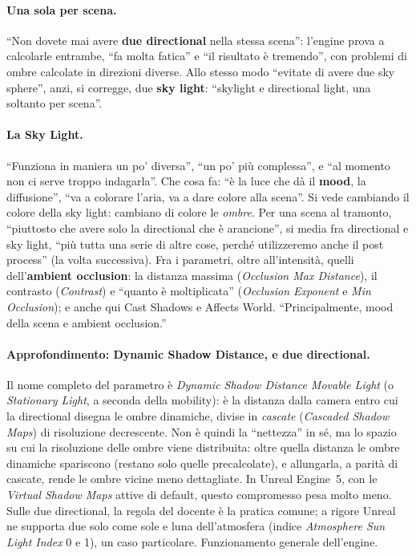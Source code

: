 \paragraph{Una sola per scena.} ``Non dovete mai avere \textbf{due directional} nella stessa
scena'': l'engine prova a calcolarle entrambe, ``fa molta fatica'' e ``il risultato è
tremendo'', con problemi di ombre calcolate in direzioni diverse. Allo stesso modo
``evitate di avere due sky sphere'', anzi, si corregge, due \textbf{sky light}: ``skylight e
directional light, una soltanto per scena''.

\paragraph{La Sky Light.} ``Funziona in maniera un po' diversa'', ``un po' più complessa'', e
``al momento non ci serve troppo indagarla''. Che cosa fa: ``è la luce che dà il
\textbf{mood}, la diffusione'', ``va a colorare l'aria, va a dare colore alla scena''. Si vede
cambiando il colore della sky light: cambiano di colore le \emph{ombre}. Per una scena al
tramonto, ``piuttosto che avere solo la directional che è arancione'', si media fra
directional e sky light, ``più tutta una serie di altre cose, perché utilizzeremo anche il
post process'' (la volta successiva). Fra i parametri, oltre all'intensità, quelli
dell'\textbf{ambient occlusion}: la distanza massima (\emph{Occlusion Max Distance}), il
contrasto (\emph{Contrast}) e ``quanto è moltiplicata'' (\emph{Occlusion Exponent} e
\emph{Min Occlusion}); e anche qui Cast Shadows e Affects World. ``Principalmente, mood
della scena e ambient occlusion.''

\paragraph{Approfondimento: Dynamic Shadow Distance, e due directional.} Il nome completo
del parametro è \emph{Dynamic Shadow Distance Movable Light} (o \emph{Stationary Light}, a
seconda della mobility): è la distanza dalla camera entro cui la directional disegna le
ombre dinamiche, divise in \emph{cascate} (\emph{Cascaded Shadow Maps}) di risoluzione
decrescente. Non è quindi la ``nettezza'' in sé, ma lo spazio su cui la risoluzione delle
ombre viene distribuita: oltre quella distanza le ombre dinamiche spariscono (restano solo
quelle precalcolate), e allungarla, a parità di cascate, rende le ombre vicine meno
dettagliate. In Unreal Engine~5, con le \emph{Virtual Shadow Maps} attive di default, questo
compromesso pesa molto meno. Sulle due directional, la regola del docente è la pratica
comune; a rigore Unreal ne supporta due solo come sole e luna dell'atmosfera (indice
\emph{Atmosphere Sun Light Index} 0 e 1), un caso particolare. Funzionamento generale
dell'engine.

